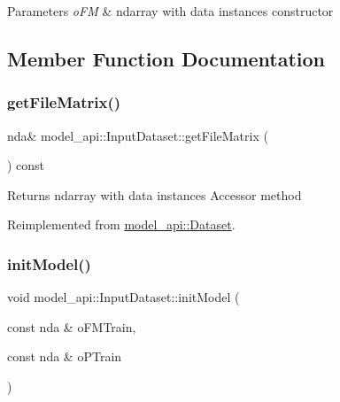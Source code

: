 \begin{DoxyParams}{Parameters}
{\em o\+FM} & ndarray with data instances constructor \\
\hline
\end{DoxyParams}


\subsection{Member Function Documentation}
\mbox{\label{classmodel__api_1_1InputDataset_a853b380f548e21ee7421f887b9be2722}} 
\subsubsection{\texorpdfstring{get\+File\+Matrix()}{getFileMatrix()}}
{\footnotesize\ttfamily nda\& model\+\_\+api\+::\+Input\+Dataset\+::get\+File\+Matrix (\begin{DoxyParamCaption}{ }\end{DoxyParamCaption}) const\hspace{0.3cm}{\ttfamily [virtual]}}

\begin{DoxyReturn}{Returns}
ndarray with data instances Accessor method 
\end{DoxyReturn}


Reimplemented from \hyperlink{classmodel__api_1_1Dataset_aa2ae7007705796c05e5df64a3d1cda0e}{model\+\_\+api\+::\+Dataset}.

\mbox{\label{classmodel__api_1_1InputDataset_af7d130afc8889825573e738906397714}} 
\subsubsection{\texorpdfstring{init\+Model()}{initModel()}}
{\footnotesize\ttfamily void model\+\_\+api\+::\+Input\+Dataset\+::init\+Model (\begin{DoxyParamCaption}\item[{const nda \&}]{o\+F\+M\+Train,  }\item[{const nda \&}]{o\+P\+Train }\end{DoxyParamCaption})}


